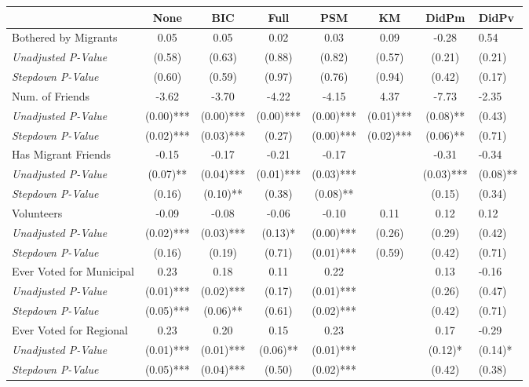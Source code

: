 \begin{tabular}{l c c c c c c}
\toprule
 & None & BIC & Full & PSM & KM & DidPm & DidPv \\
\midrule
Bothered by Migrants & 0.05 & 0.05 & 0.02 & 0.03 & 0.09 & -0.28 & 0.54 \\
\quad \textit{Unadjusted P-Value} & (0.58) & (0.63) & (0.88) & (0.82) & (0.57) & (0.21) & (0.21) \\
\quad \textit{Stepdown P-Value} & (0.60) & (0.59) & (0.97) & (0.76) & (0.94) & (0.42) & (0.17) \\
Num. of Friends & -3.62 & -3.70 & -4.22 & -4.15 & 4.37 & -7.73 & -2.35 \\
\quad \textit{Unadjusted P-Value} & (0.00)*** & (0.00)*** & (0.00)*** & (0.00)*** & (0.01)*** & (0.08)** & (0.43) \\
\quad \textit{Stepdown P-Value} & (0.02)*** & (0.03)*** & (0.27) & (0.00)*** & (0.02)*** & (0.06)** & (0.71) \\
Has Migrant Friends & -0.15 & -0.17 & -0.21 & -0.17 & & -0.31 & -0.34 \\
\quad \textit{Unadjusted P-Value} & (0.07)** & (0.04)*** & (0.01)*** & (0.03)*** & & (0.03)*** & (0.08)** \\
\quad \textit{Stepdown P-Value} & (0.16) & (0.10)** & (0.38) & (0.08)** & & (0.15) & (0.34) \\
Volunteers & -0.09 & -0.08 & -0.06 & -0.10 & 0.11 & 0.12 & 0.12 \\
\quad \textit{Unadjusted P-Value} & (0.02)*** & (0.03)*** & (0.13)* & (0.00)*** & (0.26) & (0.29) & (0.42) \\
\quad \textit{Stepdown P-Value} & (0.16) & (0.19) & (0.71) & (0.01)*** & (0.59) & (0.42) & (0.71) \\
Ever Voted for Municipal & 0.23 & 0.18 & 0.11 & 0.22 & & 0.13 & -0.16 \\
\quad \textit{Unadjusted P-Value} & (0.01)*** & (0.02)*** & (0.17) & (0.01)*** & & (0.26) & (0.47) \\
\quad \textit{Stepdown P-Value} & (0.05)*** & (0.06)** & (0.61) & (0.02)*** & & (0.42) & (0.71) \\
Ever Voted for Regional & 0.23 & 0.20 & 0.15 & 0.23 & & 0.17 & -0.29 \\
\quad \textit{Unadjusted P-Value} & (0.01)*** & (0.01)*** & (0.06)** & (0.01)*** & & (0.12)* & (0.14)* \\
\quad \textit{Stepdown P-Value} & (0.05)*** & (0.04)*** & (0.50) & (0.02)*** & & (0.42) & (0.38) \\
\bottomrule
\end{tabular}
